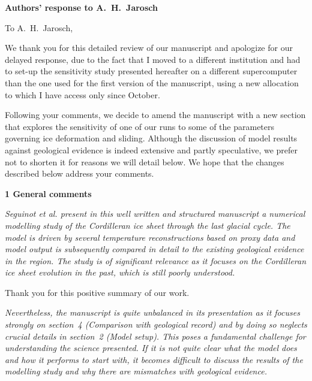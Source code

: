 


\textbf{Authors' response to A.~H.~Jarosch}
\bigskip


\newcommand{\sechead}[1]{\bigskip\noindent\textbf{#1}}
\newcommand{\referee}[1]{\bigskip\textcolor{journalname}{\textit{#1}}}
\newcommand{\msquote}[1]{\begin{quote}\textit{#1}\end{quote}}

To A.~H.~Jarosch,

We thank you for this detailed review of our manuscript and apologize for our
delayed response, due to the fact that I moved to a different institution and
had to set-up the sensitivity study presented hereafter on a different
supercomputer than the one used for the first version of the manuscript, using
a new allocation to which I have access only since October.

Following your comments, we decide to amend the manuscript with
a new section that explores the sensitivity of one of our runs to some of the
parameters governing ice deformation and sliding. Although the discussion of
model results against geological evidence is indeed extensive and partly
speculative, we prefer not to shorten it for reasons we will detail below.
We hope that the changes described below address your comments.


\sechead{1 \quad General comments}

\referee{%
    Seguinot et al. present in this well written and structured manuscript a
    numerical modelling study of the Cordilleran ice sheet through the last
    glacial cycle. The model is driven by several temperature reconstructions
    based on proxy data and model output is subsequently compared in detail to
    the existing geological evidence in the region. The study is of significant
    relevance as it focuses on the Cordilleran ice sheet evolution in the past,
    which is still poorly understood.}

Thank you for this positive summary of our work.

\referee{%
    Nevertheless, the manuscript is quite unbalanced in its presentation as it
    focuses strongly on section~4 (Comparison with geological record) and by
    doing so neglects crucial details in section~2 (Model setup). This poses a
    fundamental challenge for understanding the science presented. If it is not
    quite clear what the model does and how it performs to start with, it
    becomes difficult to discuss the results of the modelling study and why
    there are mismatches with geological evidence.}

